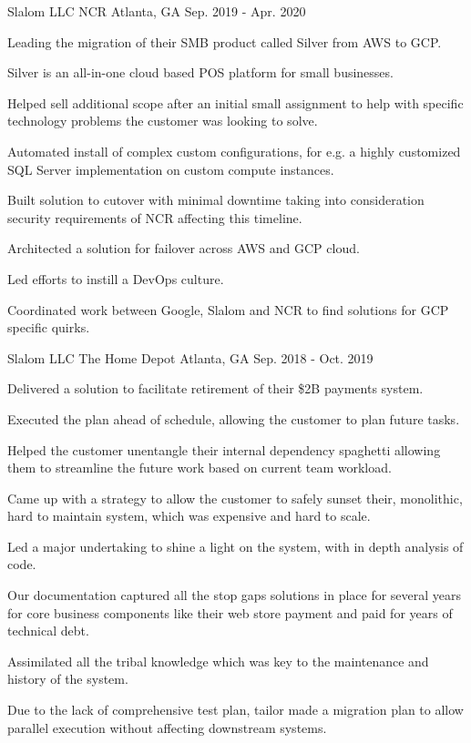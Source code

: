 \begin{cventries}
\cventry
{Slalom LLC} %
{NCR} %
{Atlanta, GA} %
{Sep. 2019 - Apr. 2020} %
{
  \begin{cvitems} %
    \item {Leading the migration of their SMB product called Silver from AWS to GCP.}
    \item {Silver is an all-in-one cloud based POS platform for small businesses.}
    \item {Helped sell additional scope after an initial small assignment to help with specific technology problems the customer was looking to solve.}
    \item {Automated install of complex custom configurations, for e.g. a highly customized SQL Server implementation on custom compute instances.}
    \item {Built solution to cutover with minimal downtime taking into consideration security requirements of NCR affecting this timeline.}
    \item {Architected a solution for failover across AWS and GCP cloud.}
    \item {Led efforts to instill a DevOps culture.}
    \item {Coordinated work between Google, Slalom and NCR to find solutions for GCP specific quirks.}
  \end{cvitems}
}

\cventry
{Slalom LLC} %
{The Home Depot} %
{Atlanta, GA} %
{Sep. 2018 - Oct. 2019} %
{
  \begin{cvitems} %
    \item {Delivered a solution to facilitate retirement of their \$2B payments system.}
    \item {Executed the plan ahead of schedule, allowing the customer to plan future tasks.}
    \item {Helped the customer unentangle their internal dependency spaghetti allowing them to streamline the future work based on current team workload.}
    \item {Came up with a strategy to allow the customer to safely sunset their, monolithic, hard to maintain system, which was expensive and hard to scale.}
    \item {Led a major undertaking to shine a light on the system, with in depth analysis of code.}
    \item {Our documentation captured all the stop gaps solutions in place for several years for core business components like their web store payment and paid for years of technical debt.}
    \item {Assimilated all the tribal knowledge which was key to the maintenance and history of the system.}
    \item {Due to the lack of comprehensive test plan, tailor made a migration plan to allow parallel execution without affecting downstream systems.}
  \end{cvitems}
}


\end{cventries}
